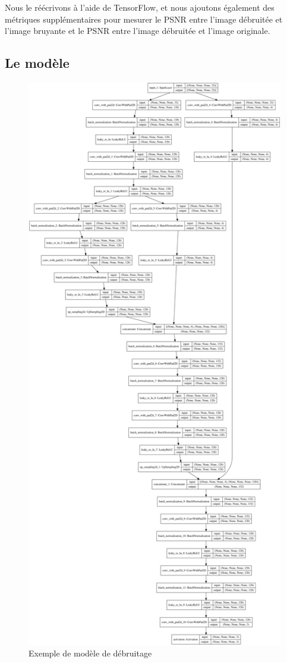 \documentclass[
  11pt,
  dvipsnames]{article}
\begin{document}
Nous le réécrivons à l'aide de TensorFlow, et nous ajoutons également des métriques supplémentaires pour mesurer le PSNR entre l'image débruitée et l'image bruyante et le PSNR entre l'image débruitée et l'image originale.

\hypertarget{le-moduxe8le}{%
\subsection{Le modèle}\label{le-moduxe8le}}

\begin{figure}

{\centering \includegraphics[height=0.75\textheight]{../res/denoising/model_sample} 

}

\caption{Exemple de modèle de débruitage}\label{fig:denoising-model}
\end{figure}
\end{document}
